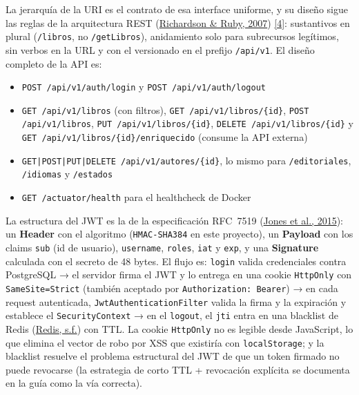 \documentclass[12pt,a4paper]{article}
\begin{document}
La jerarquía de la URI es el contrato de esa interface uniforme, y su diseño sigue las
reglas de la arquitectura REST (\hyperlink{ref:richardson}{Richardson \& Ruby, 2007}) \hyperlink{ieee4}{[4]}: sustantivos en plural
(\texttt{/libros}, no \texttt{/getLibros}), anidamiento solo para subrecursos legítimos,
sin verbos en la URL y con el versionado en el prefijo \texttt{/api/v1}. El diseño
completo de la API es:

\begin{itemize}
  \item \texttt{POST /api/v1/auth/login} y \texttt{POST /api/v1/auth/logout}
  \item \texttt{GET /api/v1/libros} (con filtros), \texttt{GET /api/v1/libros/\{id\}},
        \texttt{POST /api/v1/libros}, \texttt{PUT /api/v1/libros/\{id\}},
        \texttt{DELETE /api/v1/libros/\{id\}} y
        \texttt{GET /api/v1/libros/\{id\}/enriquecido} (consume la API externa)
  \item \texttt{GET|POST|PUT|DELETE /api/v1/autores/\{id\}}, lo mismo para
        \texttt{/editoriales}, \texttt{/idiomas} y \texttt{/estados}
  \item \texttt{GET /actuator/health} para el healthcheck de Docker
\end{itemize}

La estructura del JWT es la de la especificación RFC~7519 (\hyperlink{ref:jones2015}{Jones et al., 2015}): un
\textbf{Header} con el algoritmo (\texttt{HMAC-SHA384} en este proyecto),
un \textbf{Payload} con los claims \texttt{sub} (id de usuario), \texttt{username},
\texttt{roles}, \texttt{iat} y \texttt{exp}, y una \textbf{Signature} calculada con el
secreto de 48 bytes. El flujo es: \texttt{login} valida credenciales contra PostgreSQL →
el servidor firma el JWT y lo entrega en una cookie \texttt{HttpOnly} con
\texttt{SameSite=Strict} (también aceptado por \texttt{Authorization: Bearer}) → en cada
request autenticada, \texttt{JwtAuthenticationFilter} valida la firma y la expiración y
establece el \texttt{SecurityContext} → en el \texttt{logout}, el \texttt{jti} entra en
una blacklist de Redis (\hyperlink{ref:redis}{Redis, s.f.}) con TTL. La cookie \texttt{HttpOnly} no es legible
desde JavaScript, lo que elimina el vector de robo por XSS que existiría con
\texttt{localStorage}; y la blacklist resuelve el problema estructural del JWT de que un
token firmado no puede revocarse (la estrategia de corto TTL + revocación explícita se
documenta en la guía como la vía correcta).
\end{document}
